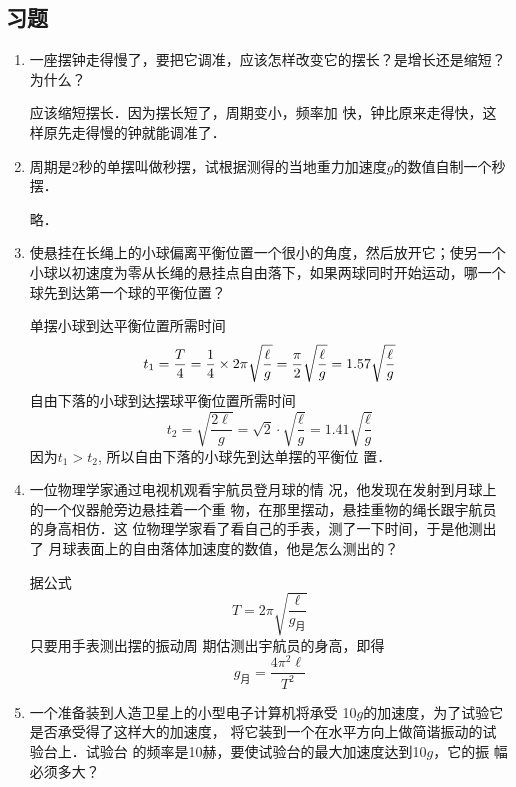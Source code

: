 \subsection{习题}
\begin{enumerate}
    \item 一座摆钟走得慢了，要把它调准，应该怎样改变它的摆长？是增长还是缩短？为什么？

    \begin{solution}
        应该缩短摆长．因为摆长短了，周期变小，频率加
        快，钟比原来走得快，这样原先走得慢的钟就能调准了．
    \end{solution}
    \item 周期是2秒的单摆叫做秒摆，试根据测得的当地重力加速度$g$的数值自制一个秒摆．

    \begin{solution}
        略．
    \end{solution}
    \item 使悬挂在长绳上的小球偏离平衡位置一个很小的角度，然后放开它；使另一个小球以初速度为零从长绳的悬挂点自由落下，如果两球同时开始运动，哪一个球先到达第一个球的平衡位置？

    \begin{solution}
        单摆小球到达平衡位置所需时间
        \[t_1=\frac{T}{4}=\frac{1}{4}\times2\pi\sqrt{\frac{\ell}{g}}=\frac{\pi}{2}\sqrt{\frac{\ell}{g}}=1.57\sqrt{\frac{\ell}{g}}\]
         自由下落的小球到达摆球平衡位置所需时间
\[t_2=\sqrt{\frac{2\ell}{g}}=\sqrt{2}\cdot \sqrt{\frac{\ell}{g}}=1.41\sqrt{\frac{\ell}{g}}\]
        因为$t_1>t_2$, 所以自由下落的小球先到达单摆的平衡位
        置．
    \end{solution}
    \item 一位物理学家通过电视机观看宇航员登月球的情
况，他发现在发射到月球上的一个仪器舱旁边悬挂着一个重
物，在那里摆动，悬挂重物的绳长跟宇航员的身高相仿．这
位物理学家看了看自己的手表，测了一下时间，于是他测出了
月球表面上的自由落体加速度的数值，他是怎么测出的？

\begin{solution}
    据公式
    \[T=2\pi\sqrt{\frac{\ell}{g_{\text{月}}}}\]
    只要用手表测出摆的振动周
    期估测出宇航员的身高，即得
    \[g_{\text{月}}=\frac{4\pi^2 \ell}{T^2}\]
\end{solution}
\item 一个准备装到人造卫星上的小型电子计算机将承受
10$g$的加速度，为了试验它是否承受得了这样大的加速度，
将它装到一个在水平方向上做简谐振动的试验台上．试验台
的频率是10赫，要使试验台的最大加速度达到10$g$，它的振
幅必须多大？


\end{enumerate}
